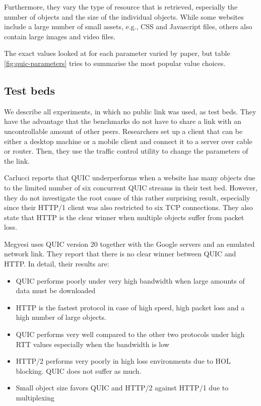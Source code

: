 \documentclass[conference]{IEEEtran}
\begin{document}
Furthermore, they vary the type of resource that is retrieved, especially the number of objects and the size of the individual objects. While some websites include a large number of small assets, e.g., CSS and Javascript files, others also contain large images and video files.

The exact values looked at for each parameter varied by paper, but table \ref{fig:quic-parameters} tries to summarise the most popular value choices.


\subsection{Test beds}

We describe all experiments, in which no public link was used, as test beds. They have the advantage that the benchmarks do not have to share a link with an uncontrollable amount of other peers. Researchers set up a client that can be either a desktop machine or a mobile client and connect it to a server over cable or router. Then, they use the traffic control utility to change the parameters of the link. 

Carlucci \cite{HTTPoverUDP} reports that QUIC underperforms when a website has many objects due to the limited number of six concurrent QUIC streams in their test bed. However, they do not investigate the root cause of this rather surprising result, especially since their HTTP/1 client was also restricted to six TCP connections. They also state that HTTP is the clear winner when multiple objects suffer from packet loss.

Megyesi \cite{HowQuickIsQuic} uses QUIC version 20 together with the Google servers and an emulated network link. They report that there is no clear winner between QUIC and HTTP. In detail, their results are:

\begin{itemize}
\item QUIC performs poorly under very high bandwidth when large amounts of data must be downloaded
\item HTTP is the fastest protocol in case of high speed, high packet loss and a high number of large objects.
\item QUIC performs very well compared to the other two protocols under high RTT values especially when the bandwidth is low
\item HTTP/2 performs very poorly in high loss environments due to HOL blocking. QUIC does not suffer as much.
\item Small object size favors QUIC and HTTP/2 against HTTP/1 due to multiplexing
\end{itemize} 
\end{document}
